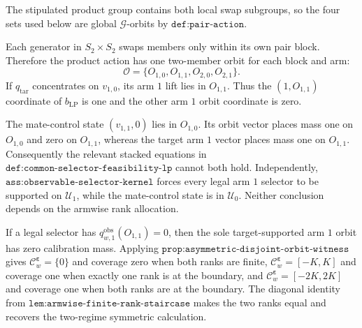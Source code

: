 The stipulated product group contains both local swap subgroups, so the four sets used below are global \(\mathcal G\)-orbits by \(\texttt{def:pair-action}\).

Each generator in \(S_2\times S_2\) swaps members only within its own pair block. Therefore the product action has one two-member orbit for each block and arm:
\[
\mathcal O=\{O_{1,0},O_{1,1},O_{2,0},O_{2,1}\}.
\tag{1}
\]
If \(q_{\mathrm{tar}}\) concentrates on \(v_{1,0}\), its arm \(1\) lift lies in \(O_{1,1}\). Thus the \((1,O_{1,1})\) coordinate of \(b_{\mathrm{LP}}\) is one and the other arm \(1\) orbit coordinate is zero.

The mate-control state \((v_{1,1},0)\) lies in \(O_{1,0}\). Its orbit vector places mass one on \(O_{1,0}\) and zero on \(O_{1,1}\), whereas the target arm \(1\) vector places mass one on \(O_{1,1}\). Consequently the relevant stacked equations in \(\texttt{def:common-selector-feasibility-lp}\) cannot both hold. Independently, \(\texttt{ass:observable-selector-kernel}\) forces every legal arm \(1\) selector to be supported on \(\mathcal U_1\), while the mate-control state is in \(\mathcal U_0\). Neither conclusion depends on the armwise rank allocation.

If a legal selector has \(q^{\mathrm{obs}}_{w,1}(O_{1,1})=0\), then the sole target-supported arm \(1\) orbit has zero calibration mass. Applying \(\texttt{prop:asymmetric-disjoint-orbit-witness}\) gives \(\mathcal C^{\boldsymbol\varepsilon}_w=\{0\}\) and coverage zero when both ranks are finite, \(\mathcal C^{\boldsymbol\varepsilon}_w=[-K,K]\) and coverage one when exactly one rank is at the boundary, and \(\mathcal C^{\boldsymbol\varepsilon}_w=[-2K,2K]\) and coverage one when both ranks are at the boundary. The diagonal identity from \(\texttt{lem:armwise-finite-rank-staircase}\) makes the two ranks equal and recovers the two-regime symmetric calculation.